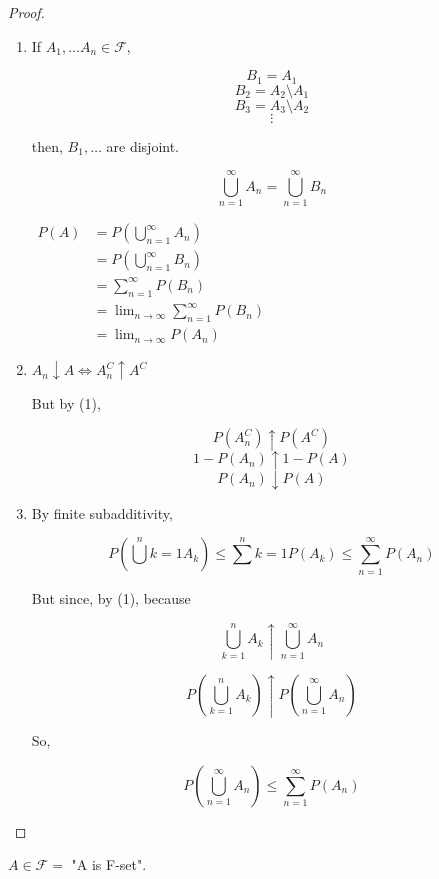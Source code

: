 \documentclass[11pt,fleqn]{book} %
\begin{document}
 \begin{proof}

 \begin{enumerate}
 	\item If $A_1, \dots A_n \in \mathcal{F}$,

		$$B_1 = A_1 $$
		$$B_2 = A_2 \setminus A_1$$
		$$B_3 = A_3 \setminus A_2$$
		$$\vdots $$

		then, $B_1, \dots$ are disjoint. 

		$$\displaystyle \bigcup^\infty_{n=1} A_n = \displaystyle \bigcup^\infty_{n=1} B_n $$

		$\begin{aligned}
			P(A) &= P(\displaystyle \bigcup^\infty_{n=1} A_n) \\
		&= P(\displaystyle \bigcup^\infty_{n=1} B_n ) \\
		&= \displaystyle \sum^\infty_{n=1} P(B_n) \\
		&= \lim_{n \rightarrow \infty} \displaystyle \sum^\infty_{n=1} P(B_n)\\ 
		&= \lim_{n \rightarrow \infty} P(A_n)
		\end{aligned}
		$

	\item $A_n \downarrow A \Leftrightarrow A_n^C \uparrow A^C$

	But by (1), 

	$$P(A_n^C) \uparrow P(A^C)$$
	$$1 - P(A_n) \uparrow 1 - P(A)$$
	$$P(A_n) \downarrow P(A)$$


	\item By finite subadditivity, 

	$$ P(\displaystyle \bigcup^n{k=1} A_k) \leq \displaystyle \sum^n{k=1} P(A_k) \leq \displaystyle \sum^\infty_{n=1} P(A_n)$$

	But since, by (1), because

	$$\displaystyle \bigcup^n_{k=1} A_k \uparrow \displaystyle \bigcup^\infty_{n=1} A_n$$

	$$P(\displaystyle \bigcup^n_{k=1} A_k) \uparrow P(\displaystyle \bigcup^\infty_{n=1} A_n)$$

	So, 

	$$P(\displaystyle \bigcup^\infty_{n=1} A_n) \leq
		 \displaystyle \sum^\infty_{n=1} P(A_n)$$


 \end{enumerate}
\end{proof}

\begin{remark}
	$A \in \mathcal{F} =$ "A is F-set".
\end{remark}
\end{document}
